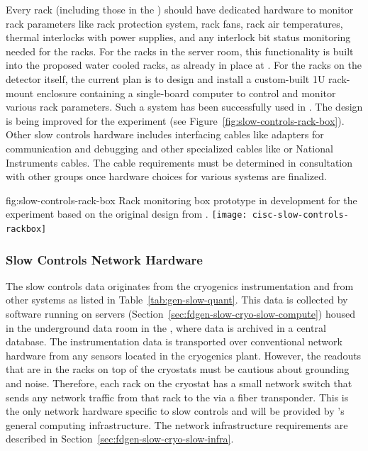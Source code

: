 Every rack (including those in the ) should have dedicated hardware to monitor rack parameters like rack protection system, rack fans, rack air temperatures, thermal interlocks with power supplies, and any interlock bit status monitoring needed for the racks. For the racks in the  server room, this functionality is built into the proposed water cooled racks, as already in place at .  For the racks on the detector itself, the current plan is to design and install a custom-built 1U rack-mount enclosure containing a single-board computer to control and monitor various rack parameters. Such a system has been successfully used in . The design is being improved for the  experiment (see Figure~\ref{fig:slow-controls-rack-box}). Other slow controls hardware includes interfacing cables like adapters for communication and debugging and other specialized cables like   or National Instruments cables. The cable requirements must be determined in consultation with other groups once hardware choices for various systems are finalized.

\begin{dunefigure}{fig:slow-controls-rack-box}
{Rack monitoring box prototype in development for the  experiment based on the original design from .}
\texttt{[image: cisc-slow-controls-rackbox]}
\end{dunefigure}


\subsubsection{Slow Controls Network Hardware}
\label{sec:fdgen-slow-cryo-slow-network}
The slow controls data originates from the cryogenics instrumentation and from other systems as listed in Table~\ref{tab:gen-slow-quant}. This data is collected by software running on servers
(Section~\ref{sec:fdgen-slow-cryo-slow-compute})
housed in the underground data room in the ,
where data is archived in a central  database.
The instrumentation data is transported over
conventional network hardware from any sensors located in the cryogenics
plant.  However, the readouts that are in the racks on top of the
cryostats must be cautious about grounding and noise.  Therefore, each
rack on the cryostat has a small network switch that sends
any network traffic from that rack to the  via a fiber transponder.
This is the only network hardware specific to slow controls and will be provided by %
's  
general computing infrastructure.  
The network infrastructure requirements are described in
Section~\ref{sec:fdgen-slow-cryo-slow-infra}.

